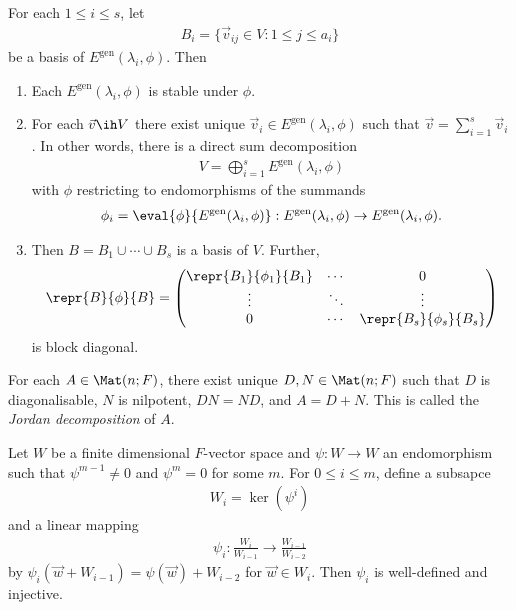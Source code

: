 \documentclass{article}
\begin{document}
\begin{proposition}[Proposition 6.3.5]
	For each $1\leq i\leq s$, let
	\begin{align*}
		B_i=\{\vec v_{ij}\in V : 1\leq j\leq a_i\}
	\end{align*}
	be a basis of $E^\text{gen}(\lambda_i,\phi)$. Then
	\begin{enumerate}
		\item Each $E^\text{gen}(\lambda_i,\phi)$ is stable under $\phi$.
		\item For each $\vec v\ih V$ there exist unique $\vec v_i\in E^\text{gen}(\lambda_i,\phi)$
		      such that $\vec v = \sum_{i=1}^s \vec v_i$. In other words, there is a direct sum decomposition
		      \begin{align*}
			      V = \bigoplus_{i=1}^s E^\text{gen}(\lambda_i,\phi)
		      \end{align*}
		      with $\phi$ restricting to endomorphisms of the summands \begin{align*}
			      \phi_i = \eval{\phi}{E^\text{gen}(\lambda_i,\phi)}:E^\text{gen}(\lambda_i,\phi)\to E^\text{gen}(\lambda_i,\phi).
		      \end{align*}
		\item Then $B=B_1\cup\cdots\cup B_s$ is a basis of $V$. Further, \begin{align*}
			      \repr{B}{\phi}{B}=\begin{pmatrix}
				                        \repr{B_1}{\phi_1}{B_1} & \cdots & 0                       \\
				                        \vdots                  & \ddots & \vdots                  \\
				                        0                       & \cdots & \repr{B_s}{\phi_s}{B_s}
			                        \end{pmatrix}
		      \end{align*}
		      is block diagonal.
	\end{enumerate}
\end{proposition}

\begin{corollary}
	For each $A\in\Mat(n; F)$, there exist unique $D,N\in\Mat(n; F)$ such that $D$ is diagonalisable,
	$N$ is nilpotent, $DN=ND$, and $A=D+N$. This is called the \emph{Jordan decomposition} of $A$.
\end{corollary}

\begin{lemma}[Lemma 6.3.6]
	Let $W$ be a finite dimensional $F$-vector space and $\psi:W\to W$ an endomorphism such that
	$\psi^{m-1}\neq 0$ and $\psi^m=0$ for some $m$. For $0\leq i\leq m$, define a subsapce
	\begin{align*}
		W_i=\ker(\psi^i)
	\end{align*}
	and a linear mapping
	\begin{align*}
		\psi_i:\frac{W_i}{W_{i-1}}\to \frac{W_{i-1}}{W_{i-2}}
	\end{align*}
	by $\psi_i(\vec w+W_{i-1})=\psi(\vec w)+W_{i-2}$ for $\vec w\in W_i$. Then $\psi_i$ is well-defined
	and injective.
\end{lemma}
\end{document}
